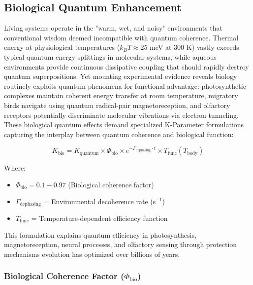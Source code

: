 \documentclass[11pt,a4paper,twoside]{article}
\begin{document}
\subsection{Biological Quantum Enhancement}

Living systems operate in the "warm, wet, and noisy" environments that conventional wisdom deemed incompatible with quantum coherence. Thermal energy at physiological temperatures ($k_B T \approx 25$ meV at 300 K) vastly exceeds typical quantum energy splittings in molecular systems, while aqueous environments provide continuous dissipative coupling that should rapidly destroy quantum superpositions. Yet mounting experimental evidence reveals biology routinely exploits quantum phenomena for functional advantage: photosynthetic complexes maintain coherent energy transfer at room temperature, migratory birds navigate using quantum radical-pair magnetoreception, and olfactory receptors potentially discriminate molecular vibrations via electron tunneling. These biological quantum effects demand specialized K-Parameter formulations capturing the interplay between quantum coherence and biological function:

\begin{theorembox}
\begin{equation}
K_{\text{bio}} = K_{\text{quantum}} \times \Phi_{\text{bio}} \times e^{-\Gamma_{\text{dephasing}} \cdot t} \times T_{\text{func}}(T_{\text{body}})
\end{equation}

Where:
\begin{itemize}[leftmargin=*]
    \item $\Phi_{\text{bio}} = 0.1-0.97$ (Biological coherence factor)
    \item $\Gamma_{\text{dephasing}}$ = Environmental decoherence rate (s$^{-1}$)
    \item $T_{\text{func}}$ = Temperature-dependent efficiency function
\end{itemize}
\end{theorembox}

This formulation explains quantum efficiency in photosynthesis, magnetoreception, neural processes, and olfactory sensing through protection mechanisms evolution has optimized over billions of years.

\subsubsection{Biological Coherence Factor ($\Phi_{\text{bio}}$)}
\end{document}
